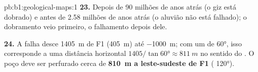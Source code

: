 \begin{solution}{pb:b1:geological-maps:1}
\textbf{23.} Depois de 90 milhões de anos atrás (o giz está dobrado) e antes de 2.58 milhões de anos atrás (o aluvião não está falhado); o dobramento veio primeiro, o falhamento depois dele.

\textbf{24.} A falha desce \qty{1405}{m} de F1 (\qty{405}{m}) até
\qty{-1000}{m}; com um  de \ang{60}, isso corresponde a uma distância horizontal
$1405/\tan\ang{60} \approx \qty{811}{m}$ no sentido do . O poço deve ser perfurado
cerca de \textbf{\qty[text-series-to-math=true]{810}{m} a leste-sudeste de F1} ( \ang{120}).
\end{solution}
